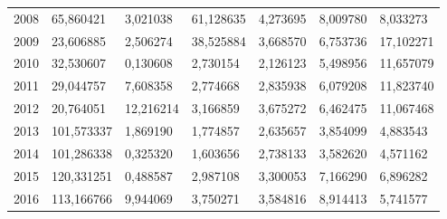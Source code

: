 \begin{table}
\begin{tabular}{p{1cm}p{2cm}p{2cm}p{2cm}p{2cm}p{2cm}p{2cm}}
 2008 &                        65,860421 &                                     3,021038 &                                    61,128635 &                                     4,273695 &                       8,009780 &                    8,033273 \\
 2009 &                        23,606885 &                                     2,506274 &                                    38,525884 &                                     3,668570 &                       6,753736 &                   17,102271 \\
 2010 &                        32,530607 &                                     0,130608 &                                     2,730154 &                                     2,126123 &                       5,498956 &                   11,657079 \\
 2011 &                        29,044757 &                                     7,608358 &                                     2,774668 &                                     2,835938 &                       6,079208 &                   11,823740 \\
 2012 &                        20,764051 &                                    12,216214 &                                     3,166859 &                                     3,675272 &                       6,462475 &                   11,067468 \\
 2013 &                       101,573337 &                                     1,869190 &                                     1,774857 &                                     2,635657 &                       3,854099 &                    4,883543 \\
 2014 &                       101,286338 &                                     0,325320 &                                     1,603656 &                                     2,738133 &                       3,582620 &                    4,571162 \\
 2015 &                       120,331251 &                                     0,488587 &                                     2,987108 &                                     3,300053 &                       7,166290 &                    6,896282 \\
 2016 &                       113,166766 &                                     9,944069 &                                     3,750271 &                                     3,584816 &                       8,914413 &                    5,741577 \\
\bottomrule
\end{tabular}
\end{table}
